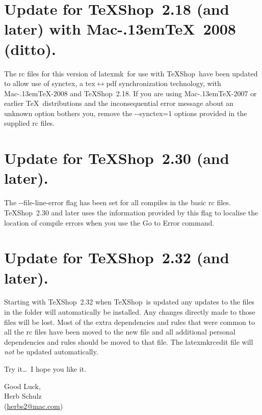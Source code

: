 \documentclass[11pt]{article}
\newcommand{\mnu}[1]{\textsf{#1}}
\newcommand{\cmd}[1]{\textsf{#1}}
\newcommand{\MacTeX}{Mac\kern-.13em\TeX}
\newcommand{\TS}{\textsf{\TeX Shop}}
\newcommand{\latexmk}{\textsf{latexmk}}
\begin{document}

\section{Update for \TS\ 2.18 (and later) with \MacTeX\ 2008 (ditto).}

The \cmd{rc} files for this version of \latexmk\ for use with \TS\ have been updated to allow use of \cmd{synctex}, a \cmd{tex\(\leftrightarrow\)pdf} synchronization technology, with \cmd{\MacTeX-2008} and \TS\ 2.18. If you are using \cmd{\MacTeX-2007} or earlier \TeX\ distributions and the inconsequential error message about an unknown option bothers you, remove the \cmd{-{}-synctex=1} options provided in the supplied \cmd{rc} files.

\section{Update for \TS\ 2.30 (and later).}

The \cmd{-{}-file-line-error} flag has been set for all compiles in the basic \cmd{rc} files. \TS\ 2.30 and later uses the information provided by this flag to localise the location of compile errors when you use the \mnu{Go to Error} command.

\section{Update for \TS\ 2.32 (and later).}

Starting with \TS\ 2.32 when \TS\ is updated any updates to the files in the  folder will automatically be installed. Any changes directly made to those files will be lost. Most of the extra dependencies and rules that were common to all the \cmd{rc} files have been moved to the new  file and all additional personal dependencies and rules should be moved to that file. The \cmd{latexmkrcedit} file will \emph{not} be updated automatically.


\vspace{5pt plus 2pt minus 1pt}\noindent
Try it\dots\ I hope you like it.

\vspace{5pt plus 2pt minus 1pt}\noindent
Good Luck,\\
Herb Schulz\\
(\href{mailto:herbs2@mac.com}{herbs2@mac.com})
\end{document}

